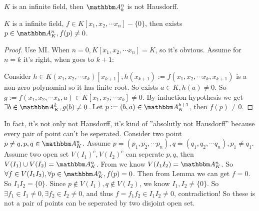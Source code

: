 \documentclass{ctexart}
\begin{document}
\begin{problem}
 $K$ is an infinite field, then $\A_k^n$ is not Hausdorff. 
\end{problem}
\begin{solution}
 \begin{lemma}
     \label{lem:2}
     $K$ is a infinite field, $f\in K[x_1,x_2,\cdots x_n]\minus \{0\}$, then exists $p\in \A_K^n,f(p)\neq 0$. 
 \end{lemma}
 \begin{proof}
     Use MI. When $n=0,K[x_1,x_2,\cdots x_n]=K$, so it's obvious. Assume for $n=k$ it's right, when goes to $k+1$:

     Consider $h\in K(x_1,x_2,\cdots x_k)[x_{k+1}],h(x_{k+1}):=f(x_1,x_2,\cdots x_k,x_{k+1})$ is a non-zero polynomial so it has finite root. So exists $a\in K,h(a)\neq 0$. So $g:=f(x_1,x_2,\cdots x_k,a)\in K[x_1,x_2,\cdots x_k]\neq 0$. 
     By induction hypothesis we get $\exists b\in \A_K^k,g(b)\neq 0$. Let $p:=(b,a)\in \A_K^{k+1}$, then $f(p)\neq 0$. 
 \end{proof}
 In fact, it's not only not Hausdorff, it's kind of ''absolutly not Hausdorff'' because every pair of point can't be seperated. 
 Consider two point $p\neq q,p,q\in \A_K^n$. 
 Assume $p=(p_1,p_2,\cdots p_n),q=(q_1,q_2,\cdots q_n),p_1\neq q_1$. Assume two open set $V(I_1)^c,V(I_2)^c$ can seperate $p,q$, then $V(I_1)\cup V(I_2)=\A_K^n$. 
 From  we know $V(I_1I_2)=\A_K^n$. So $\forall f\in V(I_1I_2),\forall p\in \A_K^n,f(p)=0$. 
 Then from Lemma we can get $f=0$. So $I_1I_2=\{0\}$. 
 Since $p\notin V(I_1),q\notin V(I_2)$, we know $I_1,I_2\neq \{0\}$. So $\exists f_1\in I_1\neq 0,\exists f_2\in I_2\neq 0$, and thus $f=f_1f_2\in I_1I_2\neq 0$, contradiction! 
 So these is not a pair of points can be seperated by two disjoint open set. 
\end{solution}
\end{document}
